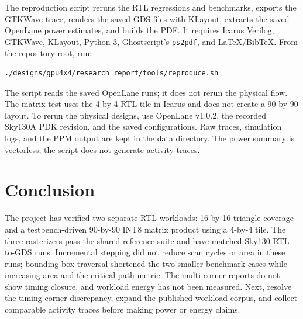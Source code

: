 \documentclass[10pt,a4paper]{article}
\begin{document}
The reproduction script reruns the RTL regressions and benchmarks, exports
the GTKWave trace, renders the saved GDS files with KLayout, extracts the
saved OpenLane power estimates, and builds the PDF. It requires Icarus
Verilog, GTKWave, KLayout, Python 3, Ghostscript's \texttt{ps2pdf}, and
LaTeX/BibTeX. From the repository root, run:
\begin{verbatim}
./designs/gpu4x4/research_report/tools/reproduce.sh
\end{verbatim}
The script reads the saved OpenLane runs; it does not rerun the physical
flow. The matrix test uses the 4-by-4 RTL tile in Icarus and does not create
a 90-by-90 layout. To rerun the physical designs, use OpenLane v1.0.2, the
recorded Sky130A PDK revision, and the saved configurations. Raw traces,
simulation logs, and the PPM output are kept in the data directory. The
power summary is vectorless; the script does not generate activity traces.

\section{Conclusion}

The project has verified two separate RTL workloads: 16-by-16 triangle
coverage and a testbench-driven 90-by-90 INT8 matrix product using a 4-by-4
tile. The three rasterizers pass the shared reference suite and have matched
Sky130 RTL-to-GDS runs. Incremental stepping did not reduce scan cycles or
area in these runs; bounding-box traversal shortened the two smaller
benchmark cases while increasing area and the critical-path metric. The
multi-corner reports do not show timing closure, and workload energy has not
been measured. Next, resolve the timing-corner discrepancy, expand the
published workload corpus, and collect comparable activity traces before
making power or energy claims.



\end{document}
